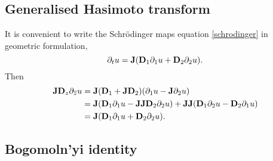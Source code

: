 \subsection{Generalised Hasimoto transform}\label{appendix:hasimoto}

It is convenient to write the Schr\"odinger maps equation \eqref{schrodinger} in geometric formulation, 
    \[
        \partial_t u 
            = {\bf J} ({\bf D}_1 \partial_1 u + {\bf D}_2 \partial_2 u). 
    \]  
Then 
    \begin{align*}
        {\bf J} {\bf D}_z \partial_{\overline z} u 
            &= {\bf J} ({\bf D}_1 + {\bf J} {\bf D}_2) (\partial_1 u - {\bf J} \partial_2 u) \\
            &= {\bf J} ({\bf D}_1 \partial_1 u - {\bf J} {\bf J} {\bf D}_2 \partial_2 u) + {\bf J}{\bf J} ({\bf D}_1 \partial_2 u - {\bf D}_2 \partial_1u)\\
            &= {\bf J} ({\bf D}_1 \partial_1 u + {\bf D}_2 \partial_2 u).
    \end{align*}


\subsection{Bogomoln'yi identity}\label{appendix:bogo}

